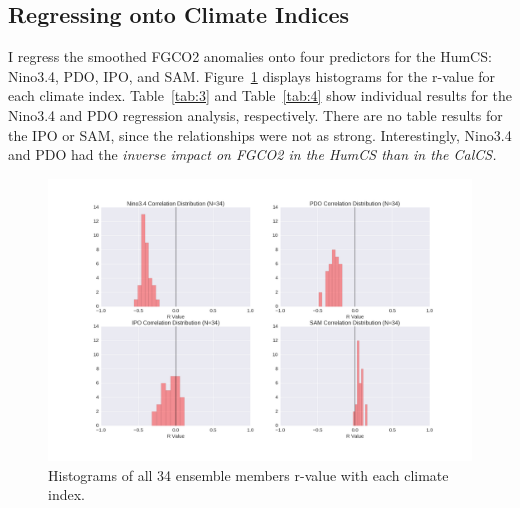 \documentclass[12pt]{article}
\begin{document}
\subsection{Regressing onto Climate Indices}
I regress the smoothed FGCO2 anomalies onto four predictors for the HumCS: Nino3.4, PDO, IPO, and SAM. Figure~\ref{fig:13} displays histograms for the r-value for each climate index. Table~\ref{tab:3} and Table~\ref{tab:4} show individual results for the Nino3.4 and PDO regression analysis, respectively. There are no table results for the IPO or SAM, since the relationships were not as strong. Interestingly, Nino3.4 and PDO had the \it inverse \rm impact on FGCO2 in the HumCS than in the CalCS.
 \begin{figure}[!h]
	\centering
	\includegraphics[width=\linewidth]{../../figs/humcs/histograms/humcs-correlation-histograms.png}
	\caption{Histograms of all 34 ensemble members r-value with each climate index.}
	\label{fig:13}
\end{figure}
\end{document}
